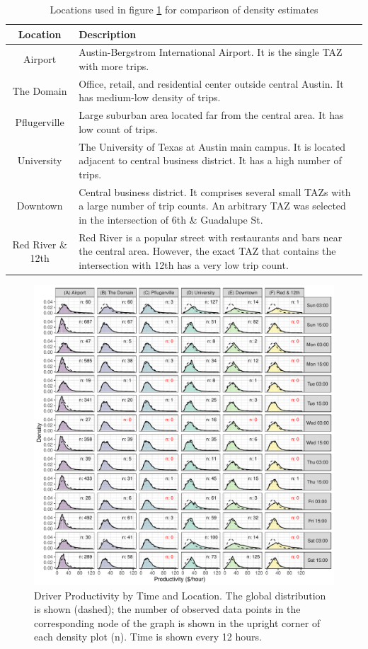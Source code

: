 \documentclass[a4paper, 11pt]{article}
\begin{document}
\begin{table}[tb]
    \centering
    \begin{tabular}{c|p{10cm}}
        \textbf{Location} & \textbf{Description} \\ \hline
        Airport &  Austin-Bergstrom International Airport. It is the single TAZ with more trips. \\ \hline
        The Domain & Office, retail, and residential center outside central Austin. It has medium-low density of trips. \\ \hline
        Pflugerville & Large suburban area located far from the central area. It has low count of trips.  \\ \hline
        University & The University of Texas at Austin main campus. It is located adjacent to central business district. It has a high number of trips.  \\ \hline
        Downtown &  Central business district. It comprises several small TAZs with a large number of trip counts. An arbitrary TAZ was selected in the intersection of 6th \& Guadalupe St. \\ \hline
        Red River \& 12th & Red River is a popular street with restaurants and bars near the central area. However, the exact TAZ that contains the intersection with 12th has a very low trip count.
    \end{tabular}
    \caption{Locations used in figure \ref{fig:spacetime-densities} for comparison of density estimates}
    \label{tbl:locations}
\end{table}

\begin{figure}[tb]
    \centering
    \includegraphics[width=0.98\linewidth]{img/densities_spacetime.pdf}
    \caption{Driver Productivity by Time and Location. The global distribution is shown (dashed); the number of observed data points in the corresponding node of the graph is shown in the upright corner of each density plot (n). Time is shown every 12 hours.}
    \label{fig:spacetime-densities}
\end{figure} 
\end{document}
